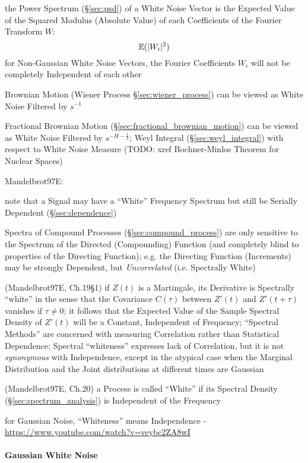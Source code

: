 the Power Spectrum (\S\ref{sec:psd}) of a White Noise Vector is the Expected
Value of the Squared Modulus (Absolute Value) of each Coefficients of the
Fourier Transform $W$:
\[
  \mathbb{E}(|W_i|^2)
\]
for Non-Gaussian White Noise Vectors, the Fourier Coefficients $W_i$ will not be
completely Independent of each other

Brownian Motion (Wiener Process \S\ref{sec:wiener_process}) can be viewed as
White Noise Filtered by $s^{-1}$

Fractional Brownian Motion (\S\ref{sec:fractional_brownian_motion}) can be
viewed as White Noise Filtered by $s^{-H-\frac{1}{2}}$;
Weyl Integral (\S\ref{sec:weyl_integral}) with respect to White Noise Measure
(TODO: xref Bochner-Minlos Theorem for Nuclear Spaces)

Mandelbrot97E:

note that a Signal may have a ``White'' Frequency Spectrum but still be Serially
Dependent (\S\ref{sec:dependence})

Spectra of Compound Processes (\S\ref{sec:compound_process}) are only sensitive
to the Spectrum of the Directed (Compounding) Function (and completely blind to
properties of the Directing Function); e.g. the Directing Function (Increments)
may be strongly Dependent, but \emph{Uncorrelated} (i.e. Spectrally White)

(Mandelbrot97E, Ch.19\S 1) if $Z(t)$ is a Martingale, its Derivative is
Spectrally ``white'' in the sense that the Covariance $C(\tau)$ between $Z'(t)$
and $Z'(t + \tau)$ vanishes if $\tau \neq 0$; it follows that the Expected Value
of the Sample Spectral Density of $Z'(t)$ will be a Constant, Independent of
Frequency; ``Spectral Methods'' are concerned with measuring Correlation rather
than Statistical Dependence; Spectral ``whiteness'' expresses lack of
Correlation, but it is not \emph{synonymous} with Independence, except in the
atypical case when the Marginal Distribution and the Joint distributions at
different times are Gaussian

(Mandelbrot97E, Ch.20) a Process is called ``White'' if its Spectral Density
(\S\ref{sec:spectrum_analysis}) is Independent of the Frequency


for Gaussian Noise, ``Whiteness'' means Independence -
\url{https://www.youtube.com/watch?v=veybc2ZA8wI}



\paragraph{Gaussian White Noise}\label{sec:gaussian_white_noise}\hfill

